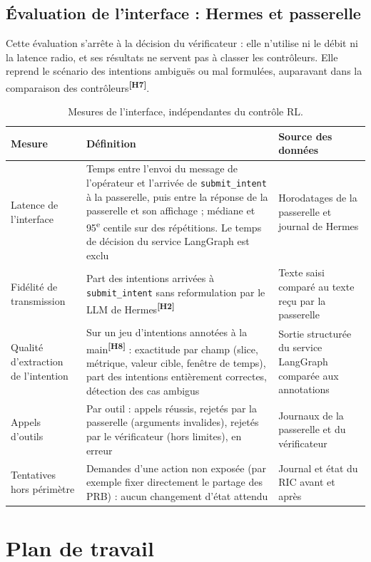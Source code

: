 \documentclass[11pt,a4paper]{article}
\newcommand{\hyp}[1]{\textsuperscript{\textbf{[H#1]}}}
\newcommand{\tool}[1]{\texttt{#1}}
\begin{document}
\subsection{Évaluation de l'interface : Hermes et passerelle}

Cette évaluation s'arrête à la décision du vérificateur : elle n'utilise ni le débit ni la
latence radio, et ses résultats ne servent pas à classer les contrôleurs. Elle reprend le
scénario des intentions ambiguës ou mal formulées, auparavant dans la comparaison des
contrôleurs\hyp{7}.

\begin{table}[H]
\centering\small
\begin{tabularx}{\textwidth}{@{}P{2.9cm}LL@{}}
\toprule
Mesure & Définition & Source des données\\
\midrule
Latence de l'interface & Temps entre l'envoi du message de l'opérateur et l'arrivée de \tool{submit\_intent} à la passerelle, puis entre la réponse de la passerelle et son affichage ; médiane et 95\textsuperscript{e} centile sur des répétitions. Le temps de décision du service LangGraph est exclu & Horodatages de la passerelle et journal de Hermes\\
Fidélité de transmission & Part des intentions arrivées à \tool{submit\_intent} sans reformulation par le LLM de Hermes\hyp{2} & Texte saisi comparé au texte reçu par la passerelle\\
Qualité d'extraction de l'intention & Sur un jeu d'intentions annotées à la main\hyp{8} : exactitude par champ (slice, métrique, valeur cible, fenêtre de temps), part des intentions entièrement correctes, détection des cas ambigus & Sortie structurée du service LangGraph comparée aux annotations\\
Appels d'outils & Par outil : appels réussis, rejetés par la passerelle (arguments invalides), rejetés par le vérificateur (hors limites), en erreur & Journaux de la passerelle et du vérificateur\\
Tentatives hors périmètre & Demandes d'une action non exposée (par exemple fixer directement le partage des PRB) : aucun changement d'état attendu & Journal et état du RIC avant et après\\
\bottomrule
\end{tabularx}
\caption{Mesures de l'interface, indépendantes du contrôle RL.}
\end{table}

\section{Plan de travail}
\end{document}
